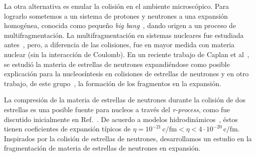 La otra alternativa es emular la colisión en el ambiente microscópico.
Para lograrlo sometemos a un sistema de protones y neutrones a una expansión homogénea, conocida como pequeño \emph{big bang}~\cite{dorso_onset_1996}, dando origen a un proceso de multifragmentación.
La multifragmentación en sistemas nucleares fue estudiada antes~\cite{bonasera_critical_2000, chikazumi_quantum_2001}, pero, a diferencia de las colisiones, fue en mayor medida con materia nuclear (sin la interacción de Coulomb).
En un reciente trabajo de Caplan et al~\cite{caplan_pasta_2015}, se estudió la materia de estrellas de neutrones expandiéndose como posible explicación para la nucleosíntesis en colisiones de estrellas de neutrones y en otro trabajo, de este grupo~\cite{alcain_dynamics_2017}, la formación de los fragmentos en la expansión.

La compresión de la materia de estrellas de neutrones durante la colisión de dos estrellas es una posible fuente para nucleos a través del \emph{r-process}, como fue discutido inicialmente en Ref.~\cite{lattimer_black-hole-neutron-star_1974}.
De acuerdo a modelos hidrodinámicos~\cite{goriely_r-process_2011}, éstos tienen coeficientes de expansión típicos de  $\eta = 10^{-21}\,\text{c/fm} < \eta < 4\cdot 10^{-20}\,\text{c/fm}$.
Inspirados por la colisión de estrellas de neutrones, desarrollamos un estudio en la fragmentación de materia de estrellas de neutrones en expansión.



